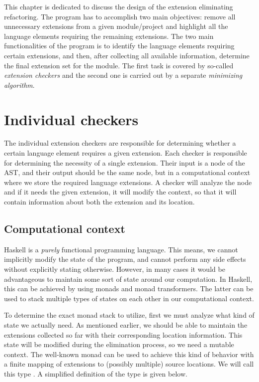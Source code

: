 \documentclass[main.tex]{subfiles}
\begin{document}
	
	This chapter is dedicated to discuss the design of the extension eliminating refactoring. The program has to accomplish two main objectives: remove all unnecessary extensions from a given module/project and highlight all the language elements requiring the remaining extensions. The two main functionalities of the program is to identify the language elements requiring certain extensions, and then, after collecting all available information, determine the final extension set for the module. The first task is covered by so-called \emph{extension checkers} and the second one is carried out by a separate \emph{minimizing algorithm}.
	
	\section{Individual checkers} \label{checker-design}
	
	The individual extension checkers are responsible for determining whether a certain language element requires a given extension. Each checker is responsible for determining the necessity of a single extension. Their input is a node of the AST, and their output should be the same node, but in a computational context where we store the required language extensions. A checker will analyze the node and if it needs the given extension, it will modify the context, so that it will contain information about both the extension and its location.
	
	\subsection{Computational context}
	
	Haskell is a \emph{purely} functional programming language. This means, we cannot implicitly modify the state of the program, and cannot perform any side effects without explicitly stating otherwise. However, in many cases it would be advantageous to maintain some sort of state around our computation. In Haskell, this can be achieved by using monads and monad transformers. The latter can be used to stack multiple types of states on each other in our computational context.
	
	To determine the exact monad stack to utilize, first we must analyze what kind of state we actually need. As mentioned earlier, we should be able to maintain the extensions collected so far with their corresponding location information. This state will be modified during the elimination process, so we need a mutable context. The well-known  monad can be used to achieve this kind of behavior with a finite mapping of extensions to (possibly multiple) source locations. We will call this type . A simplified definition of the type is given below.
	
\end{document}
